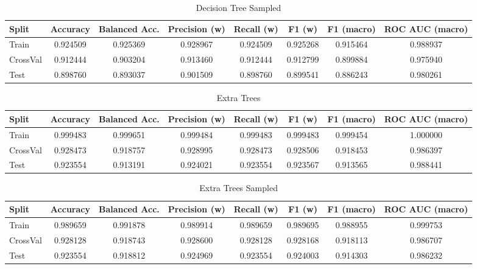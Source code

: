 \begin{table}[H]
	\centering
	\caption{Decision Tree Sampled}
	\begin{adjustbox}{max width=\textwidth}
		\begin{tabular}{lccccccc}
			\toprule
			Split & Accuracy & Balanced Acc. & Precision (w) & Recall (w) & F1 (w) & F1 (macro) & ROC AUC (macro) \\
			\midrule
			Train & 0.924509 & 0.925369 & 0.928967 & 0.924509 & 0.925268 & 0.915464 & 0.988937 \\
			CrossVal & 0.912444 & 0.903204 & 0.913460 & 0.912444 & 0.912799 & 0.899884 & 0.975940 \\
			Test & 0.898760 & 0.893037 & 0.901509 & 0.898760 & 0.899541 & 0.886243 & 0.980261 \\
			\bottomrule
		\end{tabular}
	\end{adjustbox}
\end{table}

\begin{table}[H]
	\centering
	\caption{Extra Trees}
	\begin{adjustbox}{max width=\textwidth}
		\begin{tabular}{lccccccc}
			\toprule
			Split & Accuracy & Balanced Acc. & Precision (w) & Recall (w) & F1 (w) & F1 (macro) & ROC AUC (macro) \\
			\midrule
			Train & 0.999483 & 0.999651 & 0.999484 & 0.999483 & 0.999483 & 0.999454 & 1.000000 \\
			CrossVal & 0.928473 & 0.918757 & 0.928995 & 0.928473 & 0.928506 & 0.918453 & 0.986397 \\
			Test & 0.923554 & 0.913191 & 0.924021 & 0.923554 & 0.923567 & 0.913565 & 0.988441 \\
			\bottomrule
		\end{tabular}
	\end{adjustbox}
\end{table}


\begin{table}[H]
	\centering
	\caption{Extra Trees Sampled}
	\begin{adjustbox}{max width=\textwidth}
		\begin{tabular}{lccccccc}
			\toprule
			Split & Accuracy & Balanced Acc. & Precision (w) & Recall (w) & F1 (w) & F1 (macro) & ROC AUC (macro) \\
			\midrule
			Train & 0.989659 & 0.991878 & 0.989914 & 0.989659 & 0.989695 & 0.988955 & 0.999753 \\
			CrossVal & 0.928128 & 0.918743 & 0.928600 & 0.928128 & 0.928168 & 0.918113 & 0.986707 \\
			Test & 0.923554 & 0.918812 & 0.924969 & 0.923554 & 0.924003 & 0.914303 & 0.986232 \\
			\bottomrule
		\end{tabular}
	\end{adjustbox}
\end{table}

